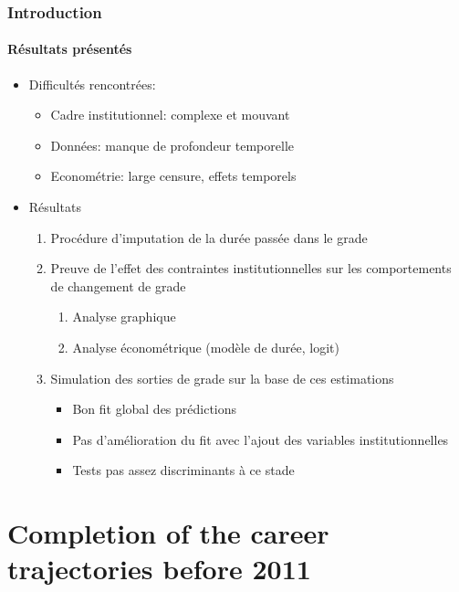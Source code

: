 \documentclass[xcolor=table,ignorenonframetext,12pt]{beamer}
\newenvironment{choixmarges}[2]{\begin{list}{}{%
\setlength{\topsep}{0pt}%
\setlength{\leftmargin}{0pt}%
\setlength{\rightmargin}{0pt}%
\setlength{\listparindent}{\parindent}%
\setlength{\itemindent}{\parindent}%
\setlength{\parsep}{0pt plus 1pt}%
\addtolength{\leftmargin}{#1}%
\addtolength{\rightmargin}{#2}%
}\item }{\end{list}}
\begin{document}
\begin{frame}
\frametitle{Introduction}
\framesubtitle{Résultats présentés}

\begin{choixmarges}{-0.5cm}{-0.5cm}


\begin{itemize}
\item Difficultés rencontrées: 
	\begin{itemize}
	\item Cadre institutionnel: complexe et mouvant
	\item Données: manque de profondeur temporelle 
	\item Econométrie: large censure, effets temporels
	\end{itemize}
 
 \vspace{0.2cm} 
\item Résultats 
	\begin{enumerate}
	\item Procédure d'imputation de la durée passée dans le grade
	\item Preuve de l'effet des contraintes institutionnelles sur les comportements de changement de grade	
		\begin{enumerate}
		\item Analyse graphique
		\item Analyse économétrique (modèle de durée, logit)
		\end{enumerate}
	\item Simulation des sorties de grade sur la base de ces estimations	
		\begin{itemize}
		\item Bon fit global des prédictions
		\item Pas d'amélioration du fit avec l'ajout des variables institutionnelles
		\item Tests pas assez discriminants à ce stade
		\end{itemize}
	 \end{enumerate}
 
	
	\end{itemize}
 

\end{choixmarges}
\end{frame}




\section{Completion of the career trajectories before 2011}
\end{document}
